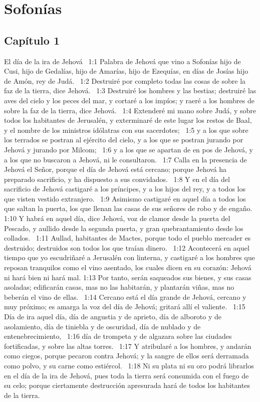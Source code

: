 \chapter{Sofonías}
\section*{Capítulo 1 }
El día de la ira de Jehová  
1:1 Palabra de Jehová que vino a Sofonías hijo de Cusi, hijo de Gedalías, hijo de Amarías, hijo de Ezequías, en días de Josías hijo de Amón, rey de Judá.  
1:2 Destruiré por completo todas las cosas de sobre la faz de la tierra, dice Jehová.  
1:3 Destruiré los hombres y las bestias; destruiré las aves del cielo y los peces del mar, y cortaré a los impíos; y raeré a los hombres de sobre la faz de la tierra, dice Jehová.  
1:4 Extenderé mi mano sobre Judá, y sobre todos los habitantes de Jerusalén, y exterminaré de este lugar los restos de Baal, y el nombre de los ministros idólatras con sus sacerdotes;  
1:5 y a los que sobre los terrados se postran al ejército del cielo, y a los que se postran jurando por Jehová y jurando por Milcom;  
1:6 y a los que se apartan de en pos de Jehová, y a los que no buscaron a Jehová, ni le consultaron.  
1:7 Calla en la presencia de Jehová el Señor, porque el día de Jehová está cercano; porque Jehová ha preparado sacrificio, y ha dispuesto a sus convidados.  
1:8 Y en el día del sacrificio de Jehová castigaré a los príncipes, y a los hijos del rey, y a todos los que visten vestido extranjero.  
1:9 Asimismo castigaré en aquel día a todos los que saltan la puerta, los que llenan las casas de sus señores de robo y de engaño.  
1:10 Y habrá en aquel día, dice Jehová, voz de clamor desde la puerta del Pescado, y aullido desde la segunda puerta, y gran quebrantamiento desde los collados.  
1:11 Aullad, habitantes de Mactes, porque todo el pueblo mercader es destruido; destruidos son todos los que traían dinero.  
1:12 Acontecerá en aquel tiempo que yo escudriñaré a Jerusalén con linterna, y castigaré a los hombres que reposan tranquilos como el vino asentado, los cuales dicen en su corazón: Jehová ni hará bien ni hará mal. 
1:13 Por tanto, serán saqueados sus bienes, y sus casas asoladas; edificarán casas, mas no las habitarán, y plantarán viñas, mas no beberán el vino de ellas.  
1:14 Cercano está el día grande de Jehová, cercano y muy próximo; es amarga la voz del día de Jehová; gritará allí el valiente.  
1:15 Día de ira aquel día, día de angustia y de aprieto, día de alboroto y de asolamiento, día de tiniebla y de oscuridad, día de nublado y de entenebrecimiento,  
1:16 día de trompeta y de algazara sobre las ciudades fortificadas, y sobre las altas torres.  
1:17 Y atribularé a los hombres, y andarán como ciegos, porque pecaron contra Jehová; y la sangre de ellos será derramada como polvo, y su carne como estiércol.  
1:18 Ni su plata ni su oro podrá librarlos en el día de la ira de Jehová, pues toda la tierra será consumida con el fuego de su celo; porque ciertamente destrucción apresurada hará de todos los habitantes de la tierra.  
